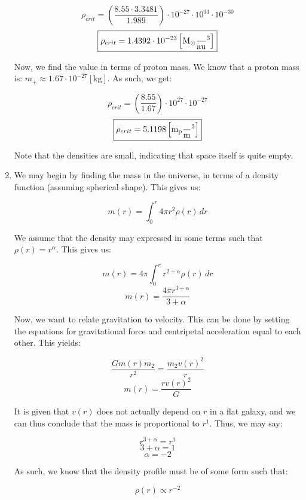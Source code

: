 \begin{enumerate}
    $$\rho_{crit}=\left( \frac{8.55\cdot 3.3481}{1.989} \right)\cdot10^{-27}\cdot10^{33}\cdot10^{-30}$$
    $$\boxed{\rho_{crit}=1.4392\cdot10^{-23}\left[ \si{M_{\odot}\over au\cubed} \right]}$$

    Now, we find the value in terms of proton mass. We know that a proton mass is: $m_+\approx1.67\cdot10^{-27}[\si{\kilo\gram}]$. As such, we get:

    $$\rho_{crit}=\left( \frac{8.55}{1.67} \right)\cdot10^{27}\cdot10^{-27}$$
    $$\boxed{\rho_{crit}=5.1198\left[ \si{m_p\over\meter\cubed} \right]}$$

    Note that the densities are small, indicating that space itself is quite empty.

  \item We may begin by finding the mass in the universe, in terms of a density function (assuming spherical shape). This gives us:

    $$m(r)=\int_0^r 4\pi r^2\rho(r)\,dr$$

    We assume that the density may expressed in some terms such that $\rho(r)=r^{\alpha}$. This gives us:

    $$m(r)=4\pi\int_0^r r^{2+\alpha}\rho(r)\,dr$$
    $$m(r)=\frac{4\pi r^{3+\alpha}}{3+\alpha}$$

    Now, we want to relate gravitation to velocity. This can be done by setting the equations for gravitational force and centripetal acceleration equal to each other. This yields:

    $$\frac{Gm(r)m_2}{r^2}=\frac{m_2v(r)^2}{r}$$
    $$m(r)=\frac{rv(r)^2}{G}$$

    It is given that $v(r)$ does not actually depend on $r$ in a flat galaxy, and we can thus conclude that the mass is proportional to $r^1$. Thus, we may say:

    $$r^{3+\alpha}=r^1$$
    $$3+\alpha=1$$
    $$\boxed{\alpha=-2}$$

    As such, we know that the density profile must be of some form such that:

    $$\boxed{\rho(r)\propto r^{-2}}$$

\end{enumerate}



